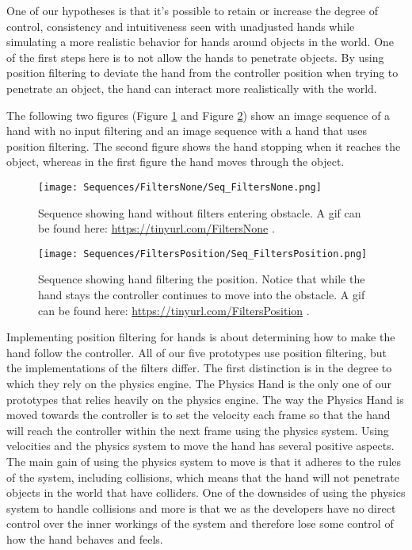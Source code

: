 One of our hypotheses is that it's possible to retain or increase the degree of control, consistency and intuitiveness seen with unadjusted hands while simulating a more realistic behavior for hands around objects in the world. One of the first steps here is to not allow the hands to penetrate objects. By using position filtering to deviate the hand from the controller position when trying to penetrate an object, the hand can interact more realistically with the world.

The following two figures (Figure \ref{fig:filtersNone} and Figure \ref{fig:filtersPosition}) show an image sequence of a hand with no input filtering and an image sequence with a hand that uses position filtering. The second figure shows the hand stopping when it reaches the object, whereas in the first figure the hand moves through the object.

\begin{figure}[H]
\centering
\texttt{[image: Sequences/FiltersNone/Seq\_FiltersNone.png]}
\caption{Sequence showing hand without filters entering obstacle. A gif can be found here: \url{https://tinyurl.com/FiltersNone} .}
\label{fig:filtersNone}
\end{figure}

\begin{figure}[H]
\centering
\texttt{[image: Sequences/FiltersPosition/Seq\_FiltersPosition.png]}
\caption{Sequence showing hand filtering the position. Notice that while the hand stays the controller continues to move into the obstacle. A gif can be found here: \url{https://tinyurl.com/FiltersPosition} .}
\label{fig:filtersPosition}
\end{figure}

Implementing position filtering for hands is about determining how to make the hand follow the controller. All of our five prototypes use position filtering, but the implementations of the filters differ. The first distinction is in the degree to which they rely on the physics engine. The Physics Hand is the only one of our prototypes that relies heavily on the physics engine. The way the Physics Hand is moved towards the controller is to set the velocity each frame so that the hand will reach the controller within the next frame using the physics system. Using velocities and the physics system to move the hand has several positive aspects. The main gain of using the physics system to move is that it adheres to the rules of the system, including collisions, which means that the hand will not penetrate objects in the world that have colliders. One of the downsides of using the physics system to handle collisions and more is that we as the developers have no direct control over the inner workings of the system and therefore lose some control of how the hand behaves and feels.

